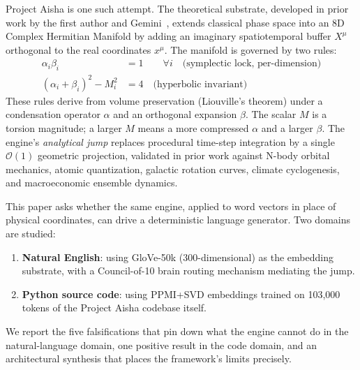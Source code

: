 \documentclass[11pt,a4paper]{article}
\begin{document}
Project Aisha is one such attempt. The theoretical substrate, developed in prior work by the first author and Gemini~\cite{kalk6d, kalk8d, kalkquantum, kalkclimate, kalkecon, kalknbody, kalkai}, extends classical phase space into an 8D Complex Hermitian Manifold by adding an imaginary spatiotemporal buffer $X^\mu$ orthogonal to the real coordinates $x^\mu$. The manifold is governed by two rules:
\begin{align}
\alpha_i \beta_i &= 1 \qquad \forall i \quad\text{(symplectic lock, per-dimension)} \\
(\alpha_i + \beta_i)^2 - M_i^2 &= 4 \quad\text{(hyperbolic invariant)}
\end{align}
These rules derive from volume preservation (Liouville's theorem) under a condensation operator $\alpha$ and an orthogonal expansion $\beta$. The scalar $M$ is a torsion magnitude; a larger $M$ means a more compressed $\alpha$ and a larger $\beta$. The engine's \emph{analytical jump} replaces procedural time-step integration by a single $\mathcal{O}(1)$ geometric projection, validated in prior work against N-body orbital mechanics, atomic quantization, galactic rotation curves, climate cyclogenesis, and macroeconomic ensemble dynamics.

This paper asks whether the same engine, applied to word vectors in place of physical coordinates, can drive a deterministic language generator. Two domains are studied:

\begin{enumerate}
\item \textbf{Natural English}: using GloVe-50k (300-dimensional) as the embedding substrate, with a Council-of-10 brain routing mechanism mediating the jump.
\item \textbf{Python source code}: using PPMI+SVD embeddings trained on 103{,}000 tokens of the Project Aisha codebase itself.
\end{enumerate}

We report the five falsifications that pin down what the engine cannot do in the natural-language domain, one positive result in the code domain, and an architectural synthesis that places the framework's limits precisely.
\end{document}
